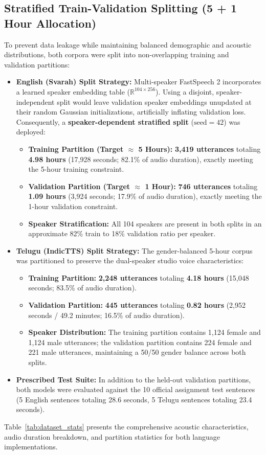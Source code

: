 \documentclass[11pt,a4paper]{article}
\begin{document}
\subsection{Stratified Train-Validation Splitting (5 + 1 Hour Allocation)}
To prevent data leakage while maintaining balanced demographic and acoustic distributions, both corpora were split into non-overlapping training and validation partitions:
\begin{itemize}
    \item \textbf{English (Svarah) Split Strategy:} Multi-speaker FastSpeech 2 incorporates a learned speaker embedding table ($\mathbb{R}^{104 \times 256}$). Using a disjoint, speaker-independent split would leave validation speaker embeddings unupdated at their random Gaussian initializations, artificially inflating validation loss. Consequently, a \textbf{speaker-dependent stratified split} ($\text{seed}=42$) was deployed:
    \begin{itemize}
        \item \textbf{Training Partition (Target $\approx$ 5 Hours):} \textbf{3,419 utterances} totaling \textbf{4.98 hours} (17,928 seconds; 82.1\% of audio duration), exactly meeting the 5-hour training constraint.
        \item \textbf{Validation Partition (Target $\approx$ 1 Hour):} \textbf{746 utterances} totaling \textbf{1.09 hours} (3,924 seconds; 17.9\% of audio duration), exactly meeting the 1-hour validation constraint.
        \item \textbf{Speaker Stratification:} All 104 speakers are present in both splits in an approximate 82\% train to 18\% validation ratio per speaker.
    \end{itemize}
    \item \textbf{Telugu (IndicTTS) Split Strategy:} The gender-balanced 5-hour corpus was partitioned to preserve the dual-speaker studio voice characteristics:
    \begin{itemize}
        \item \textbf{Training Partition:} \textbf{2,248 utterances} totaling \textbf{4.18 hours} (15,048 seconds; 83.5\% of audio duration).
        \item \textbf{Validation Partition:} \textbf{445 utterances} totaling \textbf{0.82 hours} (2,952 seconds / 49.2 minutes; 16.5\% of audio duration).
        \item \textbf{Speaker Distribution:} The training partition contains 1,124 female and 1,124 male utterances; the validation partition contains 224 female and 221 male utterances, maintaining a 50/50 gender balance across both splits.
    \end{itemize}
    \item \textbf{Prescribed Test Suite:} In addition to the held-out validation partitions, both models were evaluated against the 10 official assignment test sentences (5 English sentences totaling 28.6 seconds, 5 Telugu sentences totaling 23.4 seconds).
\end{itemize}
Table~\ref{tab:dataset_stats} presents the comprehensive acoustic characteristics, audio duration breakdown, and partition statistics for both language implementations.
\end{document}
